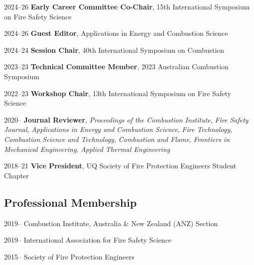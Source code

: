 \documentclass[12pt,letterpaper]{report}
\begin{document}
    \begin{tablist}

    	\item[2024--26] \tab \textbf{Early Career Committee Co-Chair}, 15th International Symposium on Fire Safety Science

        \item[2024--26] \tab \textbf{Guest Editor}, Applications in Energy and Combustion Science

    	\item[2024--24] \tab \textbf{Session Chair}, 40th International Symposium on Combustion

    	\item[2023--23] \tab \textbf{Technical Committee Member}, 2023 Australian Combustion Symposium
        
       	\item[2022--23] \tab \textbf{Workshop Chair}, 13th International Symposium on Fire Safety Science
        
        \item[2020--] \tab \textbf{Journal Reviewer}, \textit{Proceedings of the Combustion Institute}, \textit{Fire Safety Journal}, \textit{Applications in Energy and Combustion Science}, \textit{Fire Technology}, \textit{Combustion Science and Technology}, \textit{Combustion and Flame}, \textit{Frontiers in Mechanical Engineering}, \textit{Applied Thermal Engineering}  

    	\item[2018--21] \tab \textbf{Vice President}, UQ Society of Fire Protection Engineers Student Chapter



    \end{tablist}	

    \subsection*{Professional Membership}

    \begin{tablist}

        \item[2019--] \tab Combustion Institute, Australia \& New Zealand (ANZ) Section
        \item[2019--] \tab International Association for Fire Safety Science
        \item[2015--] \tab Society of Fire Protection Engineers
        
    \end{tablist}
   
\end{document}
